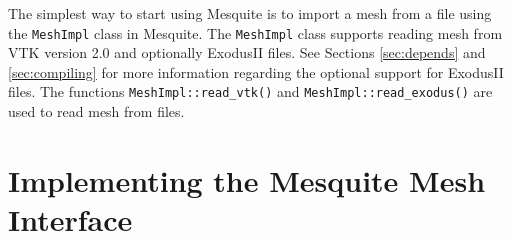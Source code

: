 The simplest way to start using Mesquite is to import a mesh from a file
using the {\tt MeshImpl} class in Mesquite.  The {\tt MeshImpl} class supports reading
mesh from VTK version 2.0 \cite{VTKbook, VTKuml} and optionally ExodusII
files. See Sections \ref{sec:depends} and \ref{sec:compiling} for more 
information regarding the optional support for ExodusII files.
The functions \texttt{MeshImpl::read\_vtk()}
and \texttt{MeshImpl::read\_exodus()} are used to read mesh from files.

\section{Implementing the Mesquite Mesh Interface} \label{sec:msq_mesh}

%
%

%


